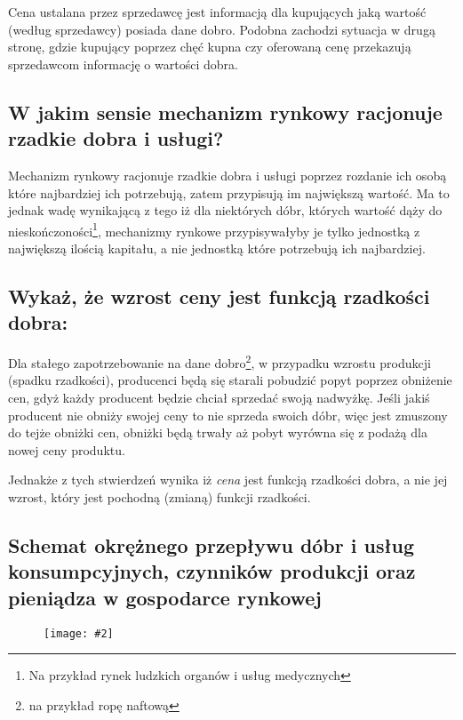 \documentclass[a4paper,12pt]{article}
\newcommand{\obrazek}[2]{
	\begin{figure}[h]
		\centering
		\texttt{[image: \#2]}
	\end{figure}
}
\begin{document}
\vspace{.3cm}

Cena ustalana przez sprzedawcę jest informacją dla kupujących jaką wartość (według sprzedawcy) posiada dane dobro. Podobna zachodzi sytuacja w drugą stronę, gdzie kupujący poprzez chęć kupna czy oferowaną cenę przekazują sprzedawcom informację o wartości dobra.

\subsection{W jakim sensie mechanizm rynkowy racjonuje rzadkie dobra i usługi?}

Mechanizm rynkowy racjonuje rzadkie dobra i usługi poprzez rozdanie ich osobą które najbardziej ich potrzebują, zatem przypisują im największą wartość. Ma to jednak wadę wynikającą z tego iż dla niektórych dóbr, których wartość dąży do nieskończoności\footnote{Na przykład rynek ludzkich organów i usług medycznych}, mechanizmy rynkowe przypisywałyby je tylko jednostką z największą ilością kapitału, a nie jednostką które potrzebują ich najbardziej.

\subsection{Wykaż, że wzrost ceny jest funkcją rzadkości dobra:}

Dla stałego zapotrzebowanie na dane dobro\footnote{na przykład ropę naftową}, w przypadku wzrostu produkcji (spadku rzadkości), producenci będą się starali pobudzić popyt poprzez obniżenie cen, gdyż każdy producent będzie chciał sprzedać swoją nadwyżkę. Jeśli jakiś producent nie obniży swojej ceny to nie sprzeda swoich dóbr, więc jest zmuszony do tejże obniżki cen, obniżki będą trwały aż pobyt wyrówna się z podażą dla nowej ceny produktu.

Jednakże z tych stwierdzeń wynika iż \emph{cena} jest funkcją rzadkości dobra, a nie jej wzrost, który jest pochodną (zmianą) funkcji rzadkości.

\subsection{Schemat okrężnego przepływu dóbr i usług konsumpcyjnych, czynników produkcji oraz pieniądza w gospodarce rynkowej}

\obrazek{0.5}{schemat1.png}
\end{document}
